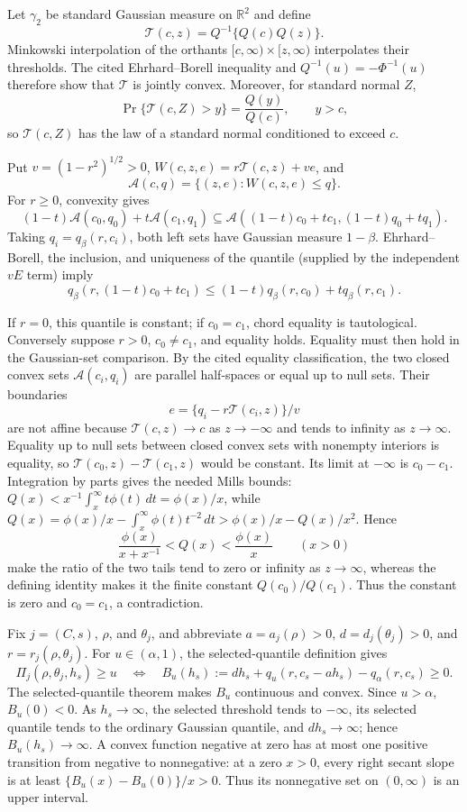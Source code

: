 Let \(\gamma_2\) be standard Gaussian measure on \(\mathbb R^2\) and define
\[
\mathcal T(c,z)=Q^{-1}\{Q(c)Q(z)\}.
\]
Minkowski interpolation of the orthants \([c,\infty)\times[z,\infty)\) interpolates their thresholds.  The cited Ehrhard--Borell inequality and \(Q^{-1}(u)=-\Phi^{-1}(u)\) therefore show that \(\mathcal T\) is jointly convex.  Moreover, for standard normal \(Z\),
\[
\Pr\{\mathcal T(c,Z)>y\}=\frac{Q(y)}{Q(c)},\qquad y>c,
\]
so \(\mathcal T(c,Z)\) has the law of a standard normal conditioned to exceed \(c\).

Put \(v=(1-r^2)^{1/2}>0\), \(W(c,z,e)=r\mathcal T(c,z)+ve\), and
\[
\mathcal A(c,q)=\{(z,e):W(c,z,e)\le q\}.
\]
For \(r\ge0\), convexity gives
\[
(1-t)\mathcal A(c_0,q_0)+t\mathcal A(c_1,q_1)
\subseteq\mathcal A((1-t)c_0+tc_1,(1-t)q_0+tq_1).
\]
Taking \(q_i=q_\beta(r,c_i)\), both left sets have Gaussian measure \(1-\beta\).  Ehrhard--Borell, the inclusion, and uniqueness of the quantile (supplied by the independent \(vE\) term) imply
\[
q_\beta(r,(1-t)c_0+tc_1)
\le(1-t)q_\beta(r,c_0)+tq_\beta(r,c_1).
\]

If \(r=0\), this quantile is constant; if \(c_0=c_1\), chord equality is tautological.  Conversely suppose \(r>0\), \(c_0\ne c_1\), and equality holds.  Equality must then hold in the Gaussian-set comparison.  By the cited equality classification, the two closed convex sets \(\mathcal A(c_i,q_i)\) are parallel half-spaces or equal up to null sets.  Their boundaries
\[
e=\{q_i-r\mathcal T(c_i,z)\}/v
\]
are not affine because \(\mathcal T(c,z)\to c\) as \(z\to-\infty\) and tends to infinity as \(z\to\infty\).  Equality up to null sets between closed convex sets with nonempty interiors is equality, so \(\mathcal T(c_0,z)-\mathcal T(c_1,z)\) would be constant.  Its limit at \(-\infty\) is \(c_0-c_1\).  Integration by parts gives the needed Mills bounds: \(Q(x)<x^{-1}\int_x^\infty t\phi(t)\,dt=\phi(x)/x\), while \(Q(x)=\phi(x)/x-\int_x^\infty\phi(t)t^{-2}\,dt>\phi(x)/x-Q(x)/x^2\).  Hence
\[
\frac{\phi(x)}{x+x^{-1}}<Q(x)<\frac{\phi(x)}x\qquad(x>0)
\]
make the ratio of the two tails tend to zero or infinity as \(z\to\infty\), whereas the defining identity makes it the finite constant \(Q(c_0)/Q(c_1)\).  Thus the constant is zero and \(c_0=c_1\), a contradiction.

Fix \(j=(C,s)\), \(\rho\), and \(\theta_j\), and abbreviate \(a=a_j(\rho)>0\), \(d=d_j(\theta_j)>0\), and \(r=r_j(\rho,\theta_j)\).  For \(u\in(\alpha,1)\), the selected-quantile definition gives
\[
\Pi_j(\rho,\theta_j,h_s)\ge u
\quad\Longleftrightarrow\quad
B_u(h_s):=dh_s+q_u(r,c_s-ah_s)-q_\alpha(r,c_s)\ge0.
\]
The selected-quantile theorem makes \(B_u\) continuous and convex.  Since \(u>\alpha\), \(B_u(0)<0\).  As \(h_s\to\infty\), the selected threshold tends to \(-\infty\), its selected quantile tends to the ordinary Gaussian quantile, and \(dh_s\to\infty\); hence \(B_u(h_s)\to\infty\).  A convex function negative at zero has at most one positive transition from negative to nonnegative: at a zero \(x>0\), every right secant slope is at least \(\{B_u(x)-B_u(0)\}/x>0\).  Thus its nonnegative set on \((0,\infty)\) is an upper interval.

